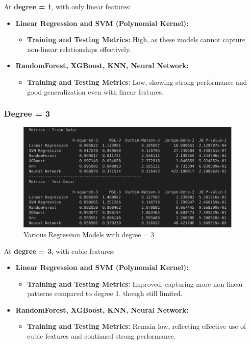 At \textbf{degree = 1}, with only linear features:

\begin{itemize}
    \item \textbf{Linear Regression and SVM (Polynomial Kernel):} 
    \begin{itemize}
        \item \textbf{Training and Testing Metrics:} High, as these models cannot capture non-linear relationships effectively.
    \end{itemize}
    
    \item \textbf{RandomForest, XGBoost, KNN, Neural Network:}
    \begin{itemize}
        \item \textbf{Training and Testing Metrics:} Low, showing strong performance and good generalization even with linear features.
    \end{itemize}
\end{itemize}

\subsubsection*{Degree = 3}

\begin{figure}[H]
    \centering
    \includegraphics[width=0.8\linewidth]{./Images/Error-Metrics-Degree-3.png}
    \caption{Various Regression Models with degree = 3}
\end{figure}

At \textbf{degree = 3}, with cubic features:

\begin{itemize}
    \item \textbf{Linear Regression and SVM (Polynomial Kernel):} 
    \begin{itemize}
        \item \textbf{Training and Testing Metrics:} Improved, capturing more non-linear patterns compared to degree 1, though still limited.
    \end{itemize}
    
    \item \textbf{RandomForest, XGBoost, KNN, Neural Network:}
    \begin{itemize}
        \item \textbf{Training and Testing Metrics:} Remain low, reflecting effective use of cubic features and continued strong performance.
    \end{itemize}
\end{itemize}

